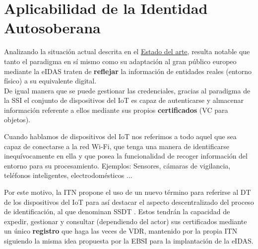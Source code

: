 \documentclass[../main.tex]{subfiles}
\begin{document}
\section{Aplicabilidad de la Identidad Autosoberana}\label{Aplicabilidad de la Identidad Autosoberana}
Analizando la situación actual descrita en el \hyperref[Estado del arte]{Estado del arte}, resulta notable que tanto el paradigma en sí mismo como su adaptación al gran público europeo mediante la \acrshort{eIDAS} traten de \textbf{reflejar} la información de entidades reales (entorno físico) a su equivalente digital. 
\\

De igual manera que se puede gestionar las credenciales, gracias al paradigma de la \acrshort{SSI} el conjunto de dispositivos del \acrfull{IoT} es capaz de autenticarse y almacenar información referente a ellos mediante sus propios \textbf{certificados} (\acrshort{VC} para objetos).

\begin{tcolorbox}[colback=gray!10!white, colframe=gray!50!black, title=Observación \theobservacion]\label{observacion-IoT}
Cuando hablamos de dispositivos del \acrshort{IoT} nos referimos a todo aquel que sea capaz de conectarse a la red Wi-Fi, que tenga una manera de identificarse inequívocamente en ella y que posea la funcionalidad de recoger información del entorno para su procesamiento. Ejemplos: Sensores, cámaras de vigilancia, teléfonos inteligentes, electrodomésticos ...
\end{tcolorbox} 

Por este motivo, la \acrfull{ITN} propone el uso de un nuevo término para referirse al \acrshort{DT} de los dispositivos del \acrshort{IoT} para así destacar el aspecto descentralizado del proceso de identificación, al que denominan \acrfull{SSDT} \cite{IOTinSSI}. 
\noindent Estos tendrán la capacidad de expedir, gestionar y consultar (dependiendo del actor) sus certificados mediante un único \textbf{registro} que haga las veces de \acrshort{VDR}, mantenido por la propia \acrshort{ITN} \cite{IOTinSSI_DIDs} siguiendo la misma idea propuesta por la \acrshort{EBSI} para la implantación de la \acrshort{eIDAS}. 
\\

\end{document}
